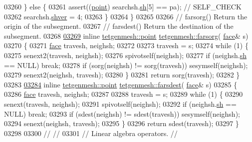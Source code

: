 \begin{DoxyCode}
03260   \} \textcolor{keywordflow}{else} \{
03261     assert((\hyperlink{classtetgenmesh_ace3fb4f80389185b7c9b18ab69a3dea2}{point}) searchsh.\hyperlink{classtetgenmesh_1_1face_a0ebac53728a624fcb6528a7d2571b987}{sh}[5] == pa); \textcolor{comment}{// SELF\_CHECK}
03262     searchsh.\hyperlink{classtetgenmesh_1_1face_a990a58ccf240d0d4197c2a923a1853d6}{shver} = 4;
03263   \}
03264 \}
03265 
03266 \textcolor{comment}{// farsorg()    Return the origin of the subsegment.}
03267 \textcolor{comment}{// farsdest()   Return the destination of the subsegment.}
03268 
\hypertarget{tetgen_8h_source.tex_l03269}{}\hyperlink{classtetgenmesh_a4cfceaae09b75d47e9f99fa1fc475d2a}{03269} \textcolor{keyword}{inline} \hyperlink{classtetgenmesh_ace3fb4f80389185b7c9b18ab69a3dea2}{tetgenmesh::point} \hyperlink{classtetgenmesh_a4cfceaae09b75d47e9f99fa1fc475d2a}{tetgenmesh::farsorg}(
      \hyperlink{classtetgenmesh_1_1face}{face}& s)
03270 \{
03271   \hyperlink{classtetgenmesh_1_1face}{face} travesh, neighsh;
03272 
03273   travesh = s;
03274   \textcolor{keywordflow}{while} (1) \{
03275     senext2(travesh, neighsh);
03276     spivotself(neighsh); 
03277     \textcolor{keywordflow}{if} (neighsh.\hyperlink{classtetgenmesh_1_1face_a0ebac53728a624fcb6528a7d2571b987}{sh} == NULL) \textcolor{keywordflow}{break};
03278     \textcolor{keywordflow}{if} (sorg(neighsh) != sorg(travesh)) sesymself(neighsh);
03279     senext2(neighsh, travesh); 
03280   \}
03281   \textcolor{keywordflow}{return} sorg(travesh);
03282 \}
03283 
\hypertarget{tetgen_8h_source.tex_l03284}{}\hyperlink{classtetgenmesh_a08a4f8d3b4b894aa461e3b3574bdd606}{03284} \textcolor{keyword}{inline} \hyperlink{classtetgenmesh_ace3fb4f80389185b7c9b18ab69a3dea2}{tetgenmesh::point} \hyperlink{classtetgenmesh_a08a4f8d3b4b894aa461e3b3574bdd606}{tetgenmesh::farsdest}(
      \hyperlink{classtetgenmesh_1_1face}{face}& s) 
03285 \{
03286   \hyperlink{classtetgenmesh_1_1face}{face} travesh, neighsh;
03287 
03288   travesh = s;
03289   \textcolor{keywordflow}{while} (1) \{
03290     senext(travesh, neighsh);
03291     spivotself(neighsh); 
03292     \textcolor{keywordflow}{if} (neighsh.\hyperlink{classtetgenmesh_1_1face_a0ebac53728a624fcb6528a7d2571b987}{sh} == NULL) \textcolor{keywordflow}{break};
03293     \textcolor{keywordflow}{if} (sdest(neighsh) != sdest(travesh)) sesymself(neighsh);
03294     senext(neighsh, travesh); 
03295   \}
03296   \textcolor{keywordflow}{return} sdest(travesh);
03297 \}
03298 
03300 \textcolor{comment}{//                                                                           //}
03301 \textcolor{comment}{// Linear algebra operators.                                                 //}

\end{DoxyCode}
